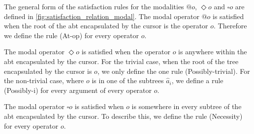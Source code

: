 \documentclass[sigplan,anonymous,review]{acmart}
\begin{document}
The general form of the satisfaction rules for the modalities $@o$, $\Diamond o$ and $\square o$ are defined in \cref{fig:satisfaction_relation_modal}. 
The modal operator $@o$ is satisfied when the root of the abt encapsulated by the cursor is the operator $o$. Therefore we define the rule (At-op) for every operator $o$.

The modal operator $\Diamond o$ is satisfied when the operator $o$ is anywhere within the abt encapsulated by the cursor. For the trivial case, when the root of the tree encapsulated by the cursor is $o$, we only define the one rule (Possibly-trivial). For the non-trivial case, where $o$ is in one of the subtrees $\hat{a}_i$, we define a rule (Possibly-i) for every argument of every operator $o$.

The modal operator $\square o$ is satisfied when $o$ is somewhere in every subtree of the abt encapsulated by the cursor. To describe this, we define the rule (Necessity) for every operator $o$.
\end{document}
